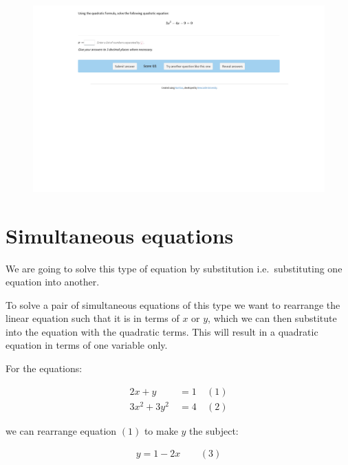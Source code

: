 \documentclass[
  a4paper,
]{scrbook}
\begin{document}
\begin{figure}

{\centering 

\href{https://numbas.mathcentre.ac.uk/question/64345/quadratics-using-the-quadratic-formula/embed/?token=df746faf-a094-4dd6-8e2b-19ae44306fc8}{\includegraphics{./07-quadratics_files/figure-pdf/unnamed-chunk-4-1.png}}

}

\end{figure}

\hypertarget{simultaneous-equations-1}{%
\section{Simultaneous equations}\label{simultaneous-equations-1}}

We are going to solve this type of equation by substitution
i.e.~substituting one equation into another.

To solve a pair of simultaneous equations of this type we want to
rearrange the linear equation such that it is in terms of \(x\) or
\(y\), which we can then substitute into the equation with the quadratic
terms. This will result in a quadratic equation in terms of one variable
only.

For the equations:

\[
\begin{aligned} 2x+y &\ = 1  &\ (1) \\ 
3x^2+3y^2 &\ = 4 &\ (2)
\end{aligned}
\]

we can rearrange equation \((1)\) to make \(y\) the subject:

\[
\begin{aligned} y = 1-2x &\ &\ (3) \end{aligned}
\]
\end{document}
